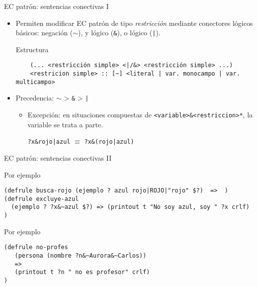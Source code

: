 \documentclass[usenames,dvipsnames,aspectratio=169]{beamer}
\begin{document}
\begin{frame}[fragile]{EC patrón: sentencias conectivas I}
	\begin{itemize}
		\item Permiten modificar EC patrón de tipo \textit{restricción} mediante conectores lógicos básicos: negación ($\sim$), y lógico (\texttt{\&}), o lógico (\texttt{|}).
		\begin{block}{Estructura}
			\begin{verbatim}
	(... <restricción simple> <|/&> <restricción simple> ...)
	<restricion simple> :: [~] <literal | var. monocampo | var. multicampo>
			\end{verbatim}
		\end{block}
		\item Precedencia: $\sim$ > \texttt{\&} > \texttt{|}
		\begin{itemize}
			\item Excepción: en situaciones compuestas de \texttt{<variable>\&<restriccion>*}, la variable se trata a parte.\\
			\begin{center}
				\texttt{?x\&rojo|azul} $\equiv$ \texttt{?x\&(rojo|azul)}
			\end{center}
		\end{itemize}
	\end{itemize}
\end{frame}

\begin{frame}[fragile]{EC patrón: sentencias conectivas II}
	\begin{exampleblock}{Por ejemplo}
		\begin{verbatim}
(defrule busca-rojo (ejemplo ? azul rojo|ROJO|"rojo" $?)  =>  )
(defrule excluye-azul
  (ejemplo ? ?x&~azul $?) => (printout t "No soy azul, soy " ?x crlf)
)
		\end{verbatim}
	\end{exampleblock}
	\begin{exampleblock}{Por ejemplo}
		\begin{verbatim}
(defrule no-profes
   (persona (nombre ?n&~Aurora&~Carlos))
   =>
   (printout t ?n " no es profesor" crlf)
)
		\end{verbatim}
	\end{exampleblock}
\end{frame}
\end{document}
